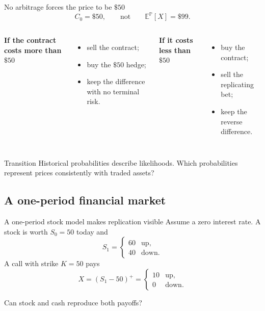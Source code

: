 \documentclass[handout,10pt,aspectratio=169]{beamer}
\begin{document}
\begin{frame}{No arbitrage forces the price to be $\$50$}
\[
C_0=\$50,
\qquad\text{not}\qquad
\mathbb E^{\mathbb P}[X]=\$99.
\]

\begin{columns}[T,onlytextwidth]
\textbf{If the contract costs more than $\$50$}
\begin{itemize}
  \item sell the contract;
  \item buy the $\$50$ hedge;
  \item keep the difference with no terminal risk.
\end{itemize}

\textbf{If it costs less than $\$50$}
\begin{itemize}
  \item buy the contract;
  \item sell the replicating bet;
  \item keep the reverse difference.
\end{itemize}
\end{columns}

\begin{block}{Transition}
Historical probabilities describe likelihoods. Which probabilities represent prices consistently with traded assets?
\end{block}
\end{frame}

\subsection{A one-period financial market}

\begin{frame}{A one-period stock model makes replication visible}
Assume a zero interest rate. A stock is worth $S_0=50$ today and
\[
S_1=
\begin{cases}
60 & \text{up},\\
40 & \text{down}.
\end{cases}
\]
A call with strike $K=50$ pays
\[
X=(S_1-50)^+
=\begin{cases}10&\text{up},\\0&\text{down}.\end{cases}
\]

\begin{center}
Can stock and cash reproduce both payoffs?
\end{center}
\end{frame}
\end{document}

